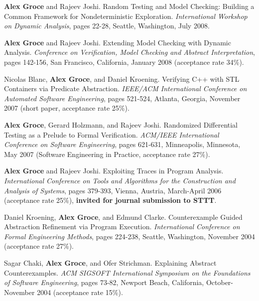 \documentclass[ComputerScience]{vita}
\begin{document}
\begin{vita}
\begin{Refereed Conference and Workshop Publications}
\item
{\bf Alex Groce} and Rajeev Joshi.
\newblock Random Testing and Model Checking:   Building a Common Framework for Nondeterministic Exploration.
\newblock \emph{International Workshop on Dynamic Analysis}, pages 22-28, Seattle, Washington, July 2008.

\item
{\bf Alex Groce} and Rajeev Joshi.
\newblock Extending Model Checking with Dynamic Analysis.
\newblock \emph{Conference on Verification, Model Checking and Abstract Interpretation}, pages 142-156, San Francisco, California, January 2008 (acceptance rate 34\%).

\item
Nicolas Blanc, {\bf Alex Groce}, and Daniel Kroening.
\newblock Verifying C++ with STL Containers via Predicate Abstraction.
\newblock \emph{IEEE/ACM International Conference on Automated Software Engineering}, pages 521-524, Atlanta, Georgia, November 2007 (short paper, acceptance rate 25\%).

\item
{\bf Alex Groce}, Gerard Holzmann, and Rajeev Joshi.
\newblock Randomized Differential Testing as a Prelude to Formal Verification.
\newblock \emph{ACM/IEEE International Conference on Software Engineering}, pages 621-631, Minneapolis, Minnesota, May 2007 (Software Engineering in Practice, acceptance rate 27\%).

\item
{\bf Alex Groce} and Rajeev Joshi.
\newblock Exploiting Traces in Program Analysis.
\newblock \emph{International Conference on Tools and Algorithms for the Construction and Analysis of Systems}, pages 379-393, Vienna, Austria, March-April 2006 (acceptance rate 25\%), {\bf invited for journal submission to STTT}.

\item
Daniel Kroening, {\bf Alex Groce}, and Edmund Clarke.
\newblock Counterexample Guided Abstraction Refinement via Program Execution.
\newblock \emph{International Conference on
   Formal Engineering Methods},  pages 224-238, Seattle, Washington, November 2004 (acceptance rate 27\%).

\item
Sagar Chaki, {\bf Alex Groce}, and Ofer Strichman.
\newblock Explaining Abstract Counterexamples.
\newblock \emph{ACM SIGSOFT International Symposium on the Foundations of Software Engineering},  pages 73-82, Newport Beach, California, October-November 2004 (acceptance rate 15\%).


\end{Refereed Conference and Workshop Publications}
\end{vita}
\end{document}
